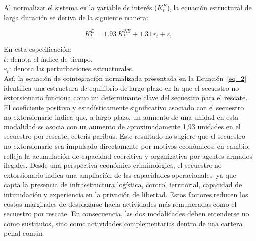\documentclass[12pt]{article}
\theoremstyle{definition}
\theoremstyle{remark}
\newcommand{\1}{\mathbf{1}}
\begin{document}
\vspace{0.3cm}

\noindent Al normalizar el sistema en la variable de interés ($K^{E}_t$), la ecuación estructural de larga duración se deriva de la siguiente manera:

\noindent
\begin{center}
    \begin{minipage}{0.50\linewidth} 
        \begin{equation}
        \label{eq_2}
            K^{E}_t = 1.93\,K^{NE}_t + 1.31\,r_t + \varepsilon_t
        \end{equation}
    \end{minipage}
\end{center}

\vspace{0.50cm}

\noindent En esta especificación: \\
$t$: denota el índice de tiempo. \\
$\varepsilon_t$: denota las perturbaciones estructurales. \\

Así, la ecuación de cointegración normalizada presentada en la Ecuación~\ref{eq_2} identifica una estructura de equilibrio de largo plazo en la que el secuestro no extorsionario funciona como un determinante clave del secuestro para el rescate. El coeficiente positivo y estadísticamente significativo asociado con el secuestro no extorsionario indica que, a largo plazo, un aumento de una unidad en esta modalidad se asocia con un aumento de aproximadamente 1,93 unidades en el secuestro por rescate, ceteris paribus. Este resultado no sugiere que el secuestro no extorsionario sea impulsado directamente por motivos económicos; en cambio, refleja la acumulación de capacidad coercitiva y organizativa por agentes armados ilegales. Desde una perspectiva económico-criminológica, el secuestro no extorsionario indica una ampliación de las capacidades operacionales, ya que capta la presencia de infraestructura logística, control territorial, capacidad de intimidación y experiencia en la privación de libertad. Estos factores reducen los costos marginales de desplazarse hacia actividades más remuneradas como el secuestro por rescate. En consecuencia, las dos modalidades deben entenderse no como sustitutos, sino como actividades complementarias dentro de una cartera penal común.
\end{document}
